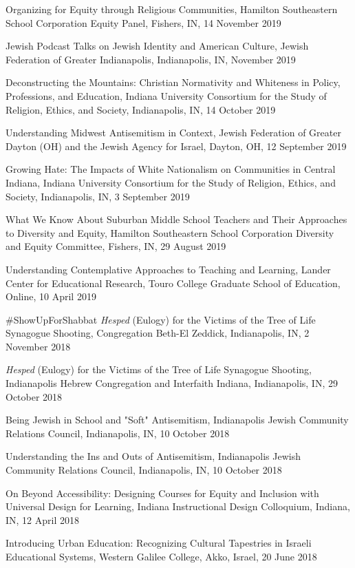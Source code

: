 \documentclass[11pt,article,oneside]{memoir}
\begin{document}
\ind Organizing for Equity through Religious Communities, Hamilton Southeastern School Corporation Equity Panel, Fishers, IN, 14 November 2019

\ind Jewish Podcast Talks on Jewish Identity and American Culture, Jewish Federation of Greater Indianapolis, Indianapolis, IN, November 2019

\ind Deconstructing the Mountains: Christian Normativity and Whiteness in Policy, Professions, and Education, Indiana University Consortium for the Study of Religion, Ethics, and Society, Indianapolis, IN, 14 October 2019

\ind Understanding Midwest Antisemitism in Context, Jewish Federation of Greater Dayton (OH) and the Jewish Agency for Israel, Dayton, OH, 12 September 2019

\ind Growing Hate: The Impacts of White Nationalism on Communities in Central Indiana, Indiana University Consortium for the Study of Religion, Ethics, and Society, Indianapolis, IN, 3 September 2019

\ind What We Know About Suburban Middle School Teachers and Their Approaches to Diversity and Equity, Hamilton Southeastern School Corporation Diversity and Equity Committee, Fishers, IN, 29 August 2019

\ind Understanding Contemplative Approaches to Teaching and Learning, Lander Center for Educational Research, Touro College Graduate School of Education, Online, 10 April 2019

\ind \#ShowUpForShabbat \textit{Hesped} (Eulogy) for the Victims of the Tree of Life Synagogue Shooting, Congregation Beth-El Zeddick, Indianapolis, IN, 2 November 2018

\ind \textit{Hesped} (Eulogy) for the Victims of the Tree of Life Synagogue Shooting, Indianapolis Hebrew Congregation and Interfaith Indiana, Indianapolis, IN, 29 October 2018

\ind Being Jewish in School and "Soft" Antisemitism, Indianapolis Jewish Community Relations Council, Indianapolis, IN, 10 October 2018

\ind Understanding the Ins and Outs of Antisemitism, Indianapolis Jewish Community Relations Council, Indianapolis, IN, 10 October 2018

\ind On Beyond Accessibility: Designing Courses for Equity and Inclusion with Universal Design for Learning, Indiana Instructional Design Colloquium, Indiana, IN, 12 April 2018

\ind Introducing Urban Education: Recognizing Cultural Tapestries in Israeli Educational Systems, Western Galilee College, Akko, Israel, 20 June 2018
\end{document}
